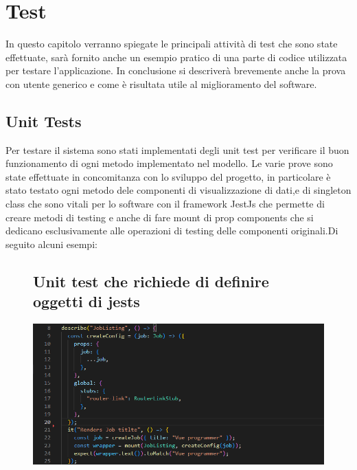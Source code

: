 \documentclass[ 4paper,11pt,openany]{book}
\begin{document}
	
\chapter{Test}
In questo capitolo verranno spiegate le principali attività di test che sono state effettuate, sarà fornito anche un esempio pratico di una parte di codice utilizzata per testare l'applicazione. In conclusione si descriverà brevemente anche la prova con utente generico e come è risultata utile al miglioramento del software.
	
\section{Unit Tests}
Per testare il sistema sono stati implementati degli unit test per verificare il buon funzionamento di ogni metodo implementato nel modello. Le varie prove sono state effettuate in concomitanza con lo sviluppo del progetto, in particolare è stato testato ogni metodo dele componenti di visualizzazione di dati,e di singleton class che sono vitali per lo software con il framework JestJs che permette di creare metodi di testing e anche di fare mount di prop components che si dedicano esclusivamente alle operazioni di testing delle componenti originali.Di seguito alcuni esempi:
\begin{figure}[htpb!] 
	\section{Unit test che richiede di definire oggetti di jests}
	\includegraphics{testWithJestObjects.png}
\end{figure}
	
\end{document}
